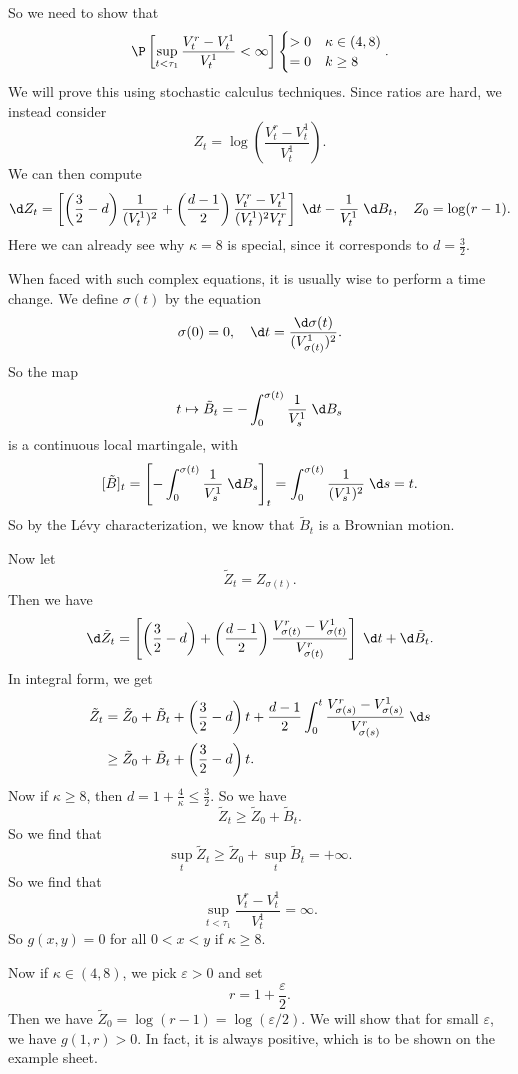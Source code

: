 \documentclass[a4paper]{article}
\begin{document}
So we need to show that
\[
  \P\left[\sup_{t < \tau_1} \frac{V_t^r - V_t^1}{V_t^1} < \infty\right]
  \begin{cases}
    >0 & \kappa \in (4, 8)\\
    =0 & k \geq 8
  \end{cases}.
\]
We will prove this using stochastic calculus techniques. Since ratios are hard, we instead consider
\[
  Z_t = \log \left(\frac{V_t^r - V_t^1}{V_t^1}\right).
\]
We can then compute
\[
  \d Z_t = \left[\left(\frac{3}{2} - d\right)\frac{1}{(V_t^1)^2} + \left(\frac{d - 1}{2}\right) \frac{V_t^r - V_t^1}{(V_t^1)^2 V_t^r}\right] \;\d t - \frac{1}{V_t^1} \;\d B_t,\quad Z_0 = \log (r - 1).
\]
Here we can already see why $\kappa = 8$ is special, since it corresponds to $d = \frac{3}{2}$.

When faced with such complex equations, it is usually wise to perform a time change. We define $\sigma(t)$ by the equation
\[
  \sigma(0) = 0,\quad \d t = \frac{\d \sigma(t)}{(V_{\sigma(t)}^1)^2}.
\]
So the map
\[
  t \mapsto \tilde{B}_t = - \int_0^{\sigma(t)} \frac{1}{V_s^1} \;\d B_s
\]
is a continuous local martingale, with
\[
  [\tilde{B}]_t = \left[ - \int_0^{\sigma(t)} \frac{1}{V_s^1} \;\d B_s\right]_t = \int_0^{\sigma(t)} \frac{1}{(V_s^1)^2}\;\d s = t.
\]
So by the L\'evy characterization, we know that $\tilde{B}_t$ is a Brownian motion.

Now let
\[
  \tilde{Z}_t = Z_{\sigma(t)}.
\]
Then we have
\[
  \d \tilde{Z}_t = \left[ \left(\frac{3}{2} - d\right) + \left(\frac{d - 1}{2}\right) \frac{V_{\sigma(t)}^r - V_{\sigma(t)}^1}{V_{\sigma(t)}^r}\right] \;\d t + \d \tilde{B}_t.
\]
In integral form, we get
\begin{align*}
  \tilde{Z}_t &= \tilde{Z}_0 + \tilde{B}_t + \left(\frac{3}{2} - d\right)t + \frac{d - 1}{2} \int_0^t \frac{V_{\sigma(s)}^r - V_{\sigma(s)}^1}{ V_{\sigma(s)}^r}\;\d s\\
  &\geq \tilde{Z}_0 + \tilde{B}_t + \left(\frac{3}{2} - d\right)t.
\end{align*}
Now if $\kappa \geq 8$, then $d = 1 + \frac{4}{\kappa} \leq \frac{3}{2}$. So we have
\[
  \tilde{Z}_t \geq \tilde{Z}_0 + \tilde{B}_t.
\]
So we find that
\[
  \sup_t \tilde{Z}_t \geq \tilde{Z}_0 + \sup_t \tilde{B}_t = + \infty.
\]
So we find that
\[
  \sup_{t < \tau_1} \frac{V_t^r - V_t^1}{V_t^1} = \infty.
\]
So $g(x, y) = 0$ for all $0 < x < y$ if $\kappa \geq 8$.

Now if $\kappa \in (4, 8)$, we pick $\varepsilon > 0$ and set
\[
  r = 1 + \frac{\varepsilon}{2}.
\]
Then we have $\tilde{Z}_0 = \log (r - 1) = \log (\varepsilon/2)$. We will show that for small $\varepsilon$, we have $g(1, r) > 0$. In fact, it is always positive, which is to be shown on the example sheet.
\end{document}
